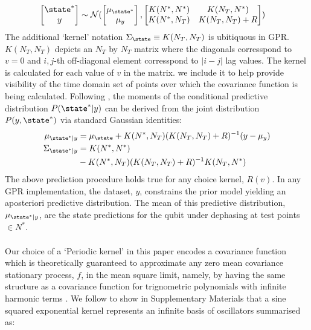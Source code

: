 \begin{align}
\begin{bmatrix} \state^* \\y \end{bmatrix} & \sim \mathcal{N} (\begin{bmatrix} \mu_{\state^*} \\ \mu_y
\end{bmatrix} , \begin{bmatrix}   K(N^*,N^*)&K(N_T,N^*) \\ K(N^*,N_T) & K(N_T,N_T) + R \end{bmatrix} )
\end{align}
The additional `kernel' notation $\Sigma_\state  \equiv K(N_T, N_T)$ is ubitiquous in GPR. $K(N_T, N_T)$ depicts an $N_T$ by $N_T$ matrix where the diagonals corresspond to $v=0$ and $i, j$-th off-diagonal element corresspond to $|i-j|$ lag values. The kernel is calculated for each value of $v$ in the matrix.  we include it to help provide visibility of the time domain set of points over which the covariance function is being calculated. Following \cite{rasmussen2006}, the moments of the conditional predictive distribution $P(\state^*|y)$ can be derived from the joint distribution $P(y,\state^*)$ via standard Gaussian identities:
\begin{align}
\mu_{\state^*|y} &= \mu_\state + K(N^*,N_T)(K(N_T,N_T) + R )^{-1} (y - \mu_y) \\
\Sigma_{\state^*|y} &= K(N^*,N^*) \nonumber \\
& - K(N^*,N_T)(K(N_T, N_T) + R)^{-1}K(N_T,N^*) 
\end{align}
The above prediction procedure holds true for any choice kernel, $R(v)$. In any GPR implementation, the dataset, $y$, constrains the prior model yielding an aposteriori predictive distribution. The mean of this predictive distribution, $\mu_{\state^*|y}$, are the state predictions for the qubit under dephasing at test points $\in N^*$.
\\
\\
Our choice of a `Periodic kernel' in this paper encodes a covariance function which is theoretically guaranteed to approximate any zero mean covariance stationary process, $f$, in the mean square limit, namely, by having the same structure as a covariance function for trignometric polynomials with infinite harmonic terms \cite{solin2014, karlin2012}. We follow \cite{solin2014} to show in Supplementary Materials that a sine squared exponential kernel represents an infinite basis of oscillators summarised as:
